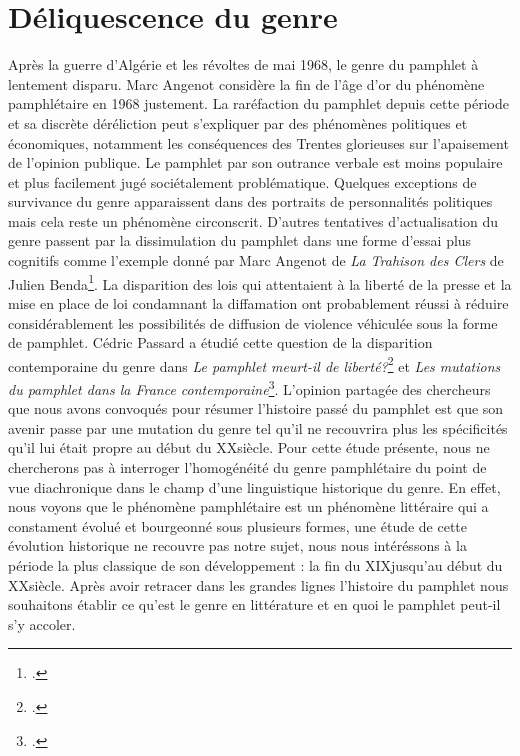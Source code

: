 \section{Déliquescence du genre}

Après la guerre d'Algérie et les révoltes de mai 1968, le genre du pamphlet à lentement disparu. Marc Angenot considère la fin de l'âge d'or du phénomène pamphlétaire en 1968 justement. La raréfaction du pamphlet depuis cette période et sa discrète déréliction peut s'expliquer par des phénomènes politiques et économiques, notamment les conséquences des Trentes glorieuses sur l'apaisement de l'opinion publique. Le pamphlet par son outrance verbale est moins populaire et plus facilement jugé sociétalement problématique. Quelques exceptions de survivance du genre apparaissent dans des portraits de personnalités politiques mais cela reste un phénomène circonscrit. D'autres tentatives d'actualisation du genre passent par la dissimulation du pamphlet dans une forme d'essai plus cognitifs comme l'exemple donné par Marc Angenot de \textit{La Trahison des Clers} de Julien Benda\footcites{angenot_parole_1982}.  La disparition des lois qui attentaient à la liberté de la presse et la mise en place de loi condamnant la diffamation ont probablement réussi à réduire considérablement les possibilités de diffusion de violence véhiculée sous la forme de pamphlet. Cédric Passard a étudié cette question de la disparition contemporaine du genre dans \textit{Le pamphlet meurt-il de liberté?}\footcites{passard_pamphlet_2009} et \textit{Les mutations du pamphlet dans la France contemporaine}\footcites{hastings_les_2009}. L'opinion partagée des chercheurs que nous avons convoqués pour résumer l'histoire passé du pamphlet est que son avenir passe par une mutation du genre tel qu'il ne recouvrira plus les spécificités qu'il lui était propre au début du XX\ieme siècle. Pour cette étude présente, nous ne chercherons pas à interroger l'homogénéité du genre pamphlétaire du point de vue diachronique dans le champ d'une linguistique historique du genre. En effet, nous voyons que le phénomène pamphlétaire est un phénomène littéraire qui a constament évolué et bourgeonné sous plusieurs formes, une étude de cette évolution historique ne recouvre pas notre sujet, nous nous intéréssons à la période la plus classique de son développement : la fin du XIX\ieme jusqu'au début du XX\ieme siècle. 
Après avoir retracer dans les grandes lignes l'histoire du pamphlet nous souhaitons établir ce qu'est le genre en littérature et en quoi le pamphlet peut-il s'y accoler.


